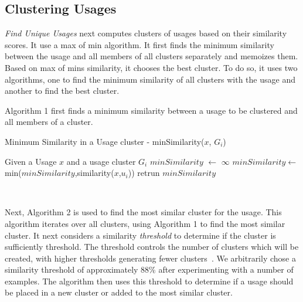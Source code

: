 \documentclass[conference]{IEEEtran}
\begin{document}
\subsection{Clustering Usages}
\textit{Find Unique Usages} next computes clusters of usages based on their similarity scores. It use a max of min algorithm. It first finds the minimum similarity between the usage and all members of all clusters separately and memoizes them. Based on max of mins similarity, it chooses the best cluster. To do so, it uses two algorithms, one to find the minimum similarity of all clusters with the usage and another to find the best cluster.\par 

Algorithm 1 first finds a minimum similarity between a usage to be clustered and all members of a cluster.\par

\begin{algorithm}
\label{algo1}
    \caption{Minimum Similarity in a Usage cluster - minSimilarity($x$, $G_{i}$)} 
    \begin{algorithmic}[1]
    \State Given a Usage $x$ and a usage cluster $G_{i}$
    \State $minSimilarity$ $\leftarrow$ $\infty$
    \State $minSimilarity$$\leftarrow$min($minSimilarity$,similarity($x$,$u_{i}$)) \EndFor
   \State retrun $minSimilarity$
    \end{algorithmic} 
     \
\end{algorithm}

Next, Algorithm 2 is used to find the most similar cluster for the usage. This algorithm iterates over all clusters, using Algorithm 1 to find the most similar cluster. It next considers a similarity \textit{threshold} to determine if the cluster is sufficiently threshold. The threshold controls the number of clusters which will be created, with higher thresholds generating fewer clusters~\cite{deng2013top}. 
We arbitrarily chose a similarity threshold of approximately 88\% after experimenting with a number of examples. The algorithm then uses this threshold to determine if a usage should be placed in a new cluster or added to the most similar cluster. 
\end{document}

